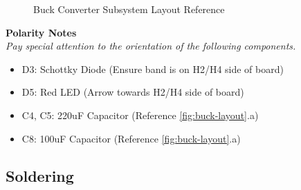 \documentclass{article}
\begin{document}
\begin{figure}[H]
    \centering
        \qquad
        \caption{Buck Converter Subsystem Layout Reference}%
    \label{fig:buck-layout}%
\end{figure}

\noindent \textbf{Polarity Notes}\\
\noindent \textit{Pay special attention to the orientation of the following components.}
\begin{itemize}
  \item D3: Schottky Diode (Ensure band is on H2/H4 side of board)
  \item D5: Red LED (Arrow towards H2/H4 side of board) 
  \item C4, C5: 220uF Capacitor (Reference \autoref{fig:buck-layout}.a) 
  \item C8: 100uF Capacitor (Reference \autoref{fig:buck-layout}.a)
\end{itemize}

\subsection{Soldering}
\end{document}
